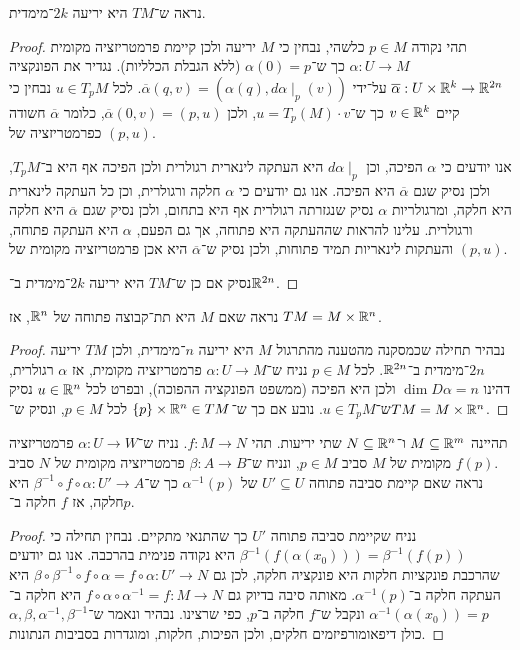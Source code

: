 \subquestion{}
נראה ש־$TM$ היא יריעה $2k$־מימדית.
\begin{proof}
	תהי נקודה $p \in M$ כלשהי, נבחין כי $M$ יריעה ולכן קיימת פרמטריזציה מקומית $\alpha : U \to M$ כך ש־$\alpha(0) = p$ (ללא הגבלת הכלליות).
	נגדיר את הפונקציה $\overline{\alpha} : U \times \mathbb{R}^k \to \mathbb{R}^{2n}$ על־ידי $\overline{\alpha}(q, v) = (\alpha(q), d \alpha \mid_p(v))$.
	לכל $u \in T_p M$ נבחין כי קיים $v \in \mathbb{R}^k$ כך ש־$u = T_p(M) \cdot v$, ולכן $\overline{\alpha}(0, v) = (p, u)$, כלומר $\overline{\alpha}$ חשודה כפרמטריזציה של $(p, u)$.

	אנו יודעים כי $\alpha$ הפיכה, וכן $d \alpha \mid_p$ היא העתקה לינארית רגולרית ולכן הפיכה אף היא ב־$T_p M$, ולכן נסיק שגם $\overline{\alpha}$ היא הפיכה.
	אנו גם יודעים כי $\alpha$ חלקה ורגולרית, וכן כל העתקה לינארית היא חלקה, ומרגולריות $\alpha$ נסיק שנגזרתה רגולרית אף היא בתחום, ולכן נסיק שגם $\overline{\alpha}$ היא חלקה ורגולרית.
	עלינו להראות שההעתקה היא פתוחה, אך גם הפעם, $\alpha$ היא העתקה פתוחה, והעתקות לינאריות תמיד פתוחות, ולכן נסיק ש־$\overline{\alpha}$ היא אכן פרמטריזציה מקומית של $(p, u)$.

	נסיק אם כן ש־$TM$ היא יריעה $2k$־מימדית ב־$\mathbb{R}^{2n}$.
\end{proof}

\subquestion{}
נראה שאם $M$ היא תת־קבוצה פתוחה של $\mathbb{R}^n$, אז $TM = M \times \mathbb{R}^n$.
\begin{proof}
	נבהיר תחילה שכמסקנה מהטענה מהתרגול $M$ היא יריעה $n$־מימדית, ולכן $TM$ יריעה $2n$־מימדית ב־$\mathbb{R}^{2n}$.
	לכל $p \in M$ נניח ש־$\alpha : U \to M$ פרמטריזציה מקומית, אז $\alpha$ רגולרית, דהינו $\dim D \alpha = n$ ולכן היא הפיכה (ממשפט הפונקציה ההפוכה), ובפרט לכל $u \in \mathbb{R}^n$ נסיק ש־$u \in T_p M$.
	נובע אם כך ש־$\{ p \} \times \mathbb{R}^n \in TM$ לכל $p \in M$, ונסיק ש־$TM = M \times \mathbb{R}^n$.
\end{proof}

\question{}
תהיינה $M \subseteq \mathbb{R}^m$ ו־$N \subseteq \mathbb{R}^n$ שתי יריעות.
תהי $f : M \to N$.
נניח ש־$\alpha : U \to W$ פרמטריזציה מקומית של $M$ סביב $p \in M$,
ונניח ש־$\beta : A \to B$ פרמטריזציה מקומית של $N$ סביב $f(p)$. \\
נראה שאם קיימת סביבה פתוחה $U' \subseteq U$ של $\alpha^{-1}(p)$ כך ש־$\beta^{-1} \circ f \circ \alpha : U' \to A$ היא חלקה, אז $f$ חלקה ב־$p$.
\begin{proof}
	נניח שקיימת סביבה פתוחה $U'$ כך שהתנאי מתקיים.
	נבחין תחילה כי $\beta^{-1}(f(\alpha(x_0))) = \beta^{-1}(f(p))$ היא נקודה פנימית בהרכבה.
	אנו גם יודעים שהרכבת פונקציות חלקות היא פונקציה חלקה, לכן גם $\beta \circ \beta^{-1} \circ f \circ \alpha = f \circ \alpha : U' \to N$ היא העתקה חלקה ב־$\alpha^{-1}(p)$.
	מאותה סיבה בדיוק גם $f \circ \alpha \circ \alpha^{-1} = f : M \to N$ היא חלקה ב־$\alpha^{-1}(\alpha(x_0)) = p$ ונקבל ש־$f$ חלקה ב־$p$, כפי שרצינו.
	נבהיר ונאמר ש־$\alpha, \beta, \alpha^{-1}, \beta^{-1}$ כולן דיפאומורפיזמים חלקים, ולכן הפיכות, חלקות, ומוגדרות בסביבות הנתונות.
\end{proof}


